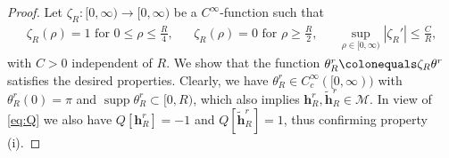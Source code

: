 \documentclass{amsart}
\numberwithin{equation}{section}
\theoremstyle{definition}
\theoremstyle{remark}
\DeclareMathOperator{\supp}{supp}
\newcommand{\boM}{\mathcal{M}}
\newcommand{\te}{\ensuremath{\theta}}
\newcommand{\bh}{{\mathbf{h}}}
\begin{document}
\begin{proof}
Let $\zeta_R:[0,\infty)\to [0,\infty)$ be a $C^\infty$-function such that
\begin{align*}
\zeta_R(\rho)=1 \text{ for } 0\le\rho\le \frac R4, &&
\zeta_R(\rho)=0 \text{ for } \rho\ge \frac R2, &&
\sup_{\rho\in[0,\infty)}|\zeta_R'| \le \frac CR, 
\end{align*}
with $C>0$ independent of $R$.
We show that the function $\te^r_R \colonequals \zeta_R \te^r$ satisfies the desired properties.
Clearly, we have $\te^r_R\in C^\infty_c([0,\infty))$ with $\te^r_R(0)=\pi$ and $\supp \te^r_R \subset [0,R)$, which also implies $\bh^r_R,\tilde\bh^r_R\in\boM$.
In view of \eqref{eq:Q} we also have $Q[\bh^r_R]=-1$ and $Q[\tilde\bh^r_R]=1$, thus confirming property (i).


\end{proof}
\end{document}
